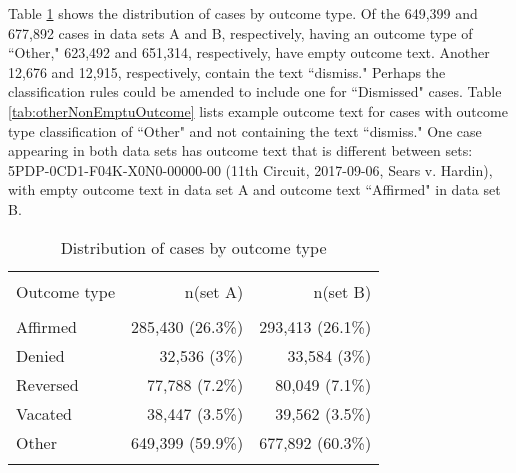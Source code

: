 \documentclass[10pt, letterpaper]{article}
\begin{document}
\begin{spacing}{1.0}
Table \ref{tab:distOutcomeType} shows the distribution of cases by outcome type.  Of the 649,399 and 677,892 cases in data sets A and B, respectively, having an outcome type of ``Other," 623,492 and 651,314, respectively, have empty outcome text.  Another 12,676 and 12,915, respectively, contain the text ``dismiss."   Perhaps the classification rules could be amended to include one for ``Dismissed" cases.  Table \ref{tab:otherNonEmptuOutcome} lists example outcome text for cases with outcome type classification of ``Other" and not containing the text ``dismiss."  One case appearing in both data sets has outcome text that is different between sets:  5PDP-0CD1-F04K-X0N0-00000-00 (11th Circuit, 2017-09-06, Sears v. Hardin), with empty outcome text in data set A and outcome text ``Affirmed" in data set B.

\vspace{20pt}

\begin{table}[H]
    \centering
    \caption{Distribution of cases by outcome type}
    \begin{tabular}{lrr}
        \hline\\[-6pt]
        Outcome type & n(set A) & n(set B)\\[4pt]
        \hline\\[-6pt]
        Affirmed & 285,430 (26.3\%) & 293,413 (26.1\%)\\
        Denied &  32,536 (3\%) &  33,584 (3\%)\\
        Reversed &  77,788 (7.2\%) &  80,049 (7.1\%)\\
        Vacated &  38,447 (3.5\%) &  39,562 (3.5\%)\\
        Other & 649,399 (59.9\%) & 677,892 (60.3\%)\\[4pt]
        \hline\\
    \end{tabular}
    \label{tab:distOutcomeType}
\end{table}

\vspace{20pt}


\end{spacing}
\end{document}
